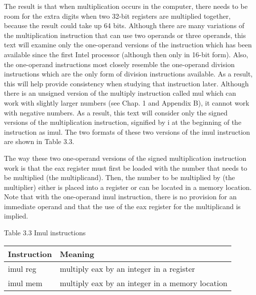 \documentclass[10pt]{article}
\begin{document}
The result is that when multiplication occurs in the computer, there needs to be room for the extra digits when two 32-bit registers are multiplied together, because the result could take up 64 bits. Although there are many variations of the multiplication instruction that can use two operands or three operands, this text will examine only the one-operand versions of the instruction which has been available since the first Intel processor (although then only in 16-bit form). Also, the one-operand instructions most closely resemble the one-operand division instructions which are the only form of division instructions available. As a result, this will help provide consistency when studying that instruction later. Although there is an unsigned version of the multiply instruction called mul which can work with slightly larger numbers (see Chap. 1 and Appendix B), it cannot work with negative numbers. As a result, this text will consider only the signed versions of the multiplication instruction, signified by i at the beginning of the instruction as imul. The two formats of these two versions of the imul instruction are shown in Table 3.3.

The way these two one-operand versions of the signed multiplication instruction work is that the eax register must first be loaded with the number that needs to be multiplied (the multiplicand). Then, the number to be multiplied by (the multiplier) either is placed into a register or can be located in a memory location. Note that with the one-operand imul instruction, there is no provision for an immediate operand and that the use of the eax register for the multiplicand is implied.

Table 3.3 Imul instructions

\begin{center}
\begin{tabular}{|l|l|}
\hline
Instruction & Meaning \\
\hline
imul reg & multiply eax by an integer in a register \\
\hline
imul mem & multiply eax by an integer in a memory location \\
\hline
\end{tabular}
\end{center}
\end{document}
